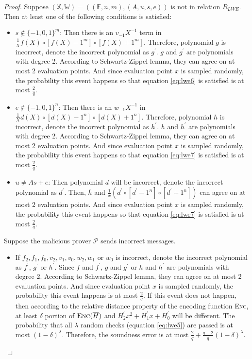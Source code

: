 \begin{proof}

Suppose $(\mathbb{X}, \mathbb{W}) = ((\mathbb{F}, n, m), (A, u, s, e))$ is not in relation $R_{LWE}$. Then at least one of the following conditions is satisfied:
\begin{itemize}
    \item $s \notin \{-1, 0, 1\}^{m}$: Then there is an $v_{-1} X^{-1}$ term in $\frac{1}{X} f(X) \circ [f(X) - 1^m] \circ [f(X) + 1^m]$. Therefore, polynomial $g$ is incorrect, denote the incorrect polynomial as $g^\prime$. $g$ and $g^\prime$ are polynomials with degree 2. According to Schwartz-Zippel lemma, they can agree on at most 2 evaluation points. And since evaluation point $x$ is sampled randomly, the probability this event happens so that equation \ref{eq:lwe6} is satisfied is at most $\frac{2}{q}$. 
    
    \item $e \notin \{-1, 0, 1\}^{n}$: Then there is an $w_{-1} X^{-1}$ in $\frac{1}{X} d(X) \circ [d(X) - 1^n] \circ [d(X) + 1^n]$. Therefore, polynomial $h$ is incorrect, denote the incorrect polynomial as $h^\prime$. $h$ and $h^\prime$ are polynomials with degree 2. According to Schwartz-Zippel lemma, they can agree on at most 2 evaluation points. And since evaluation point $x$ is sampled randomly, the probability this event happens so that equation \ref{eq:lwe7} is satisfied is at most $\frac{2}{q}$. 
    
    \item $u \neq As + e$: Then polynomial $d$ will be incorrect, denote the incorrect polynomial as $d^\prime$. Then, $\overline{h}$ and $\frac{1}{x} (d^\prime \circ [d^\prime - 1^n] \circ [d^\prime + 1^n])$ can agree on at most 2 evaluation points. And since evaluation point $x$ is sampled randomly, the probability this event happens so that equation \ref{eq:lwe7} is satisfied is at most $\frac{2}{q}$. 
    
\end{itemize}

Suppose the malicious prover $\mathcal{P}$ sends incorrect messages. 
\begin{itemize}
    
    \item If $f_2, f_1, f_0, v_2, v_1, v_0, w_2, w_1$ or $w_0$ is incorrect, denote the incorrect polynomial as $f^\prime$, $g^\prime$ or $h^\prime$. Since $f$ and $f^\prime$, $g$ and $g^\prime$ or $h$ and $h^\prime$ are polynomials with degree 2. According to Schwartz-Zippel lemma, they can agree on at most 2 evaluation points. And since evaluation point $x$ is sampled randomly, the probability this event happens is at most $\frac{2}{q}$. If this event does not happen, then according to the relative distance property of the encoding function \textsc{Enc}, at least $\delta$ portion of $\textsc{Enc}(\overline{H})$ and $H_2^\prime x^2 + H_1^\prime x + H_0^\prime$ will be different. The probability that all $\lambda$ random checks (equation \ref{eq:lwe5}) are passed is at most $(1 - \delta)^\lambda$. Therefore, the soundness error is at most $\frac{2}{q} + \frac{q-2}{q}(1 - \delta)^\lambda$.


\end{itemize}
\end{proof}
